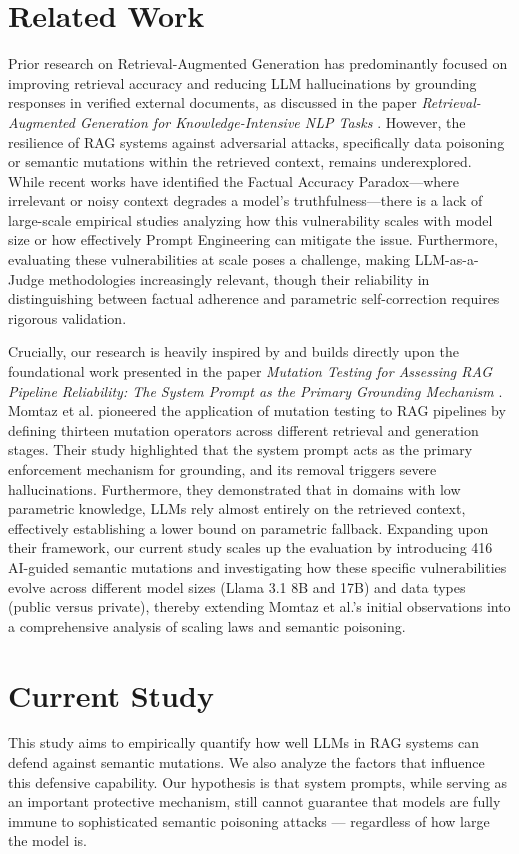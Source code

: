 \documentclass[
    a4paper,
    man,
    floatsintext
]{glossaPX2}
\newcommand{\parencite}[1]{\cite{#1}}
\begin{document}
\section{Related Work}
\label{related}
Prior research on Retrieval-Augmented Generation has predominantly focused on improving retrieval accuracy and reducing LLM hallucinations by grounding responses in verified external documents, as discussed in the paper \textit{Retrieval-Augmented Generation for Knowledge-Intensive NLP Tasks} \parencite{lewis2020retrieval}. However, the resilience of RAG systems against adversarial attacks, specifically data poisoning or semantic mutations within the retrieved context, remains underexplored. While recent works have identified the Factual Accuracy Paradox---where irrelevant or noisy context degrades a model's truthfulness---there is a lack of large-scale empirical studies analyzing how this vulnerability scales with model size or how effectively Prompt Engineering can mitigate the issue. Furthermore, evaluating these vulnerabilities at scale poses a challenge, making LLM-as-a-Judge methodologies increasingly relevant, though their reliability in distinguishing between factual adherence and parametric self-correction requires rigorous validation.

Crucially, our research is heavily inspired by and builds directly upon the foundational work presented in the paper \textit{Mutation Testing for Assessing RAG Pipeline Reliability: The System Prompt as the Primary Grounding Mechanism} \parencite{momtaz2026mutation}. Momtaz et al. pioneered the application of mutation testing to RAG pipelines by defining thirteen mutation operators across different retrieval and generation stages. Their study highlighted that the system prompt acts as the primary enforcement mechanism for grounding, and its removal triggers severe hallucinations. Furthermore, they demonstrated that in domains with low parametric knowledge, LLMs rely almost entirely on the retrieved context, effectively establishing a lower bound on parametric fallback. Expanding upon their framework, our current study scales up the evaluation by introducing 416 AI-guided semantic mutations and investigating how these specific vulnerabilities evolve across different model sizes (Llama 3.1 8B and 17B) and data types (public versus private), thereby extending Momtaz et al.'s initial observations into a comprehensive analysis of scaling laws and semantic poisoning.
\section{Current Study}
\label{current}
This study aims to empirically quantify how well LLMs in RAG systems can defend against semantic mutations. We also analyze the factors that influence this defensive capability. Our hypothesis is that system prompts, while serving as an important protective mechanism, still cannot guarantee that models are fully immune to sophisticated semantic poisoning attacks --- regardless of how large the model is.
\end{document}
